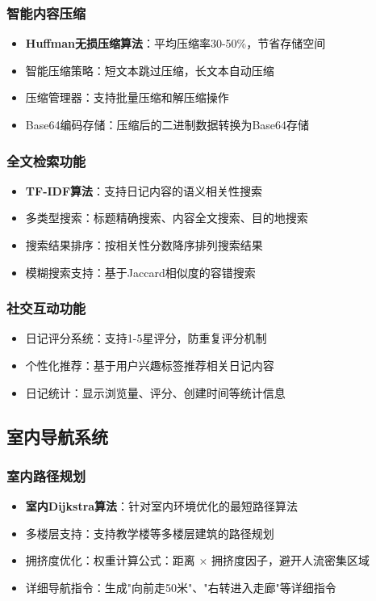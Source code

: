 \documentclass[12pt,a4paper]{article}
\begin{document}
\subsubsection{智能内容压缩}
\begin{itemize}
    \item \textbf{Huffman无损压缩算法}：平均压缩率30-50\%，节省存储空间
    \item 智能压缩策略：短文本跳过压缩，长文本自动压缩
    \item 压缩管理器：支持批量压缩和解压缩操作
    \item Base64编码存储：压缩后的二进制数据转换为Base64存储
\end{itemize}

\subsubsection{全文检索功能}
\begin{itemize}
    \item \textbf{TF-IDF算法}：支持日记内容的语义相关性搜索
    \item 多类型搜索：标题精确搜索、内容全文搜索、目的地搜索
    \item 搜索结果排序：按相关性分数降序排列搜索结果
    \item 模糊搜索支持：基于Jaccard相似度的容错搜索
\end{itemize}

\subsubsection{社交互动功能}
\begin{itemize}
    \item 日记评分系统：支持1-5星评分，防重复评分机制
    \item 个性化推荐：基于用户兴趣标签推荐相关日记内容
    \item 日记统计：显示浏览量、评分、创建时间等统计信息
\end{itemize}

\subsection{室内导航系统}
\subsubsection{室内路径规划}
\begin{itemize}
    \item \textbf{室内Dijkstra算法}：针对室内环境优化的最短路径算法
    \item 多楼层支持：支持教学楼等多楼层建筑的路径规划
    \item 拥挤度优化：权重计算公式：距离 × 拥挤度因子，避开人流密集区域
    \item 详细导航指令：生成"向前走50米"、"右转进入走廊"等详细指令
\end{itemize}
\end{document}
